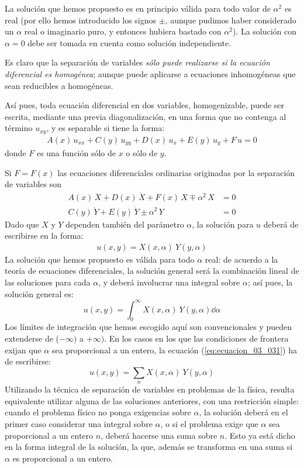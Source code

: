 \par
La solución que hemos propuesto es en principio válida para todo valor de $\alpha^{2}$ es real (por ello hemos introducido los signos $\pm$, aunque pudimos haber considerado un $\alpha$ real o imaginario puro, y entonces hubiera bastado con $\alpha^{2}$). La solución con $\alpha = 0$ debe ser tomada en cuenta como solución independiente.
\par
Es claro que la separación de variables \emph{sólo puede realizarse si la ecuación diferencial es homogénea}; aunque puede aplicarse a ecuaciones inhomogéneas que sean reducibles a homogéneas.
\par
Así pues, toda ecuación diferencial en dos variables, homogenizable, puede ser escrita, mediante una previa diagonalización, en una forma que no contenga al término $u_{xy}$, y es separable si tiene la forma:
\begin{align*}
A(x) \, u_{xx} + C(y) \, u_{yy} + D(x) \, u_{x} + E(y) \, u_{y} + F \, u = 0
\end{align*}
donde $F$ es una función sólo de $x$ o sólo de $y$.
\par
Si $F = F (x)$ las ecuaciones diferenciales ordinarias originadas por la separación de variables son
\begin{align*}
A(x) \, \ddot{X} +D(x) \, \dot{X} + F(x) \, X \mp \alpha^{2} \, X &= 0 \\
C(y) \, \ddot{Y} + E(y) \, \dot{Y} \pm \alpha^{2} \, Y &= 0
\end{align*}
Dado que $X$ y $Y$ dependen también del parámetro $\alpha$, la solución para $u$ deberá de escribirse en la forma:
\begin{align*}
u(x, y) = X(x, \alpha) \: Y (y, \alpha)
\end{align*}
La solución que hemos propuesto es válida para todo $\alpha$ real: de acuerdo a la teoría de ecuaciones diferenciales, la solución general será la combinación lineal de las soluciones para cada $\alpha$, y deberá involucrar una integral sobre $\alpha$; así pues, la solución general es:
\begin{equation}
u(x, y) = \int_{0}^{\infty} X(x, \alpha) \: Y(y, \alpha) \dd{\alpha}
\label{eq:ecuacion_03_031}
\end{equation}
Los límites de integración que hemos escogido aquí son convencionales y pueden extenderse de ($-\infty)$ a $+\infty)$. En los casos en los que las condiciones de frontera exijan que $\alpha$ sea proporcional a un entero, la ecuación (\ref{eq:ecuacion_03_031}) ha de escribirse:
\begin{equation}
u(x, y) = \sum_{n} X(x, \alpha) \: Y(y, \alpha)
\label{eq:ecuacion_03_032}
\end{equation}
Utilizando la técnica de separación de variables en problemas de la física, resulta equivalente utilizar alguna de las  soluciones anteriores, con una restricción simple: cuando el problema físico no ponga exigencias sobre $\alpha$, la solución deberá en el primer caso considerar una integral sobre $\alpha$, o si el problema exige que $\alpha$ sea proporcional a un entero $n$, deberá hacerse una suma sobre $n$. Esto ya está dicho en la forma integral de la solución, la que, además se transforma en una suma si $\alpha$ es proporcional a un entero.
